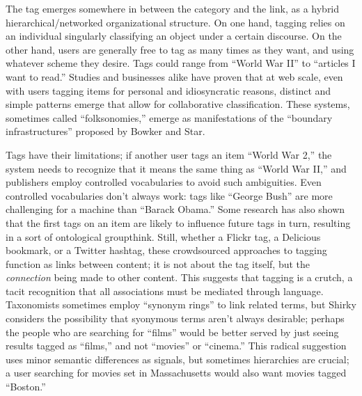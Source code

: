 The tag emerges somewhere in between the category and the link, as a hybrid hierarchical/networked organizational structure. On one hand, tagging relies on an individual singularly classifying an object under a certain discourse. On the other hand, users are generally free to tag as many times as they want, and using whatever scheme they desire. Tags could range from ``World War II'' to ``articles I want to read.'' Studies and businesses alike have proven that at web scale, even with users tagging items for personal and idiosyncratic reasons, distinct and simple patterns emerge that allow for collaborative classification.\autocite{cattuto_semiotic_2007} These systems, sometimes called ``folksonomies,'' emerge as manifestations of the ``boundary infrastructures'' proposed by Bowker and Star.\autocite[See also section 2.1.]{bowker_sorting_2000}

Tags have their limitations; if another user tags an item ``World War 2,'' the system needs to recognize that it means the same thing as ``World War II,'' and publishers employ controlled vocabularies to avoid such ambiguities. Even controlled vocabularies don't always work: tags like ``George Bush'' are more challenging for a machine than ``Barack Obama.'' Some research has also shown that the first tags on an item are likely to influence future tags in turn, resulting in a sort of ontological groupthink.\autocite{cattuto_semiotic_2007} Still, whether a Flickr tag, a Delicious bookmark, or a Twitter hashtag, these crowdsourced approaches to tagging function as links between content; it is not about the tag itself, but the \emph{connection} being made to other content. This suggests that tagging is a crutch, a tacit recognition that all associations must be mediated through language. Taxonomists sometimes employ ``synonym rings'' to link related terms, but Shirky considers the possibility that syonymous terms aren't always desirable; perhaps the people who are searching for ``films'' would be better served by just seeing results tagged as ``films,'' and not ``movies'' or ``cinema.''\autocite{shirky_ontology_2005} This radical suggestion uses minor semantic differences as signals, but sometimes hierarchies are crucial; a user searching for movies set in Massachusetts would also want movies tagged ``Boston.''


